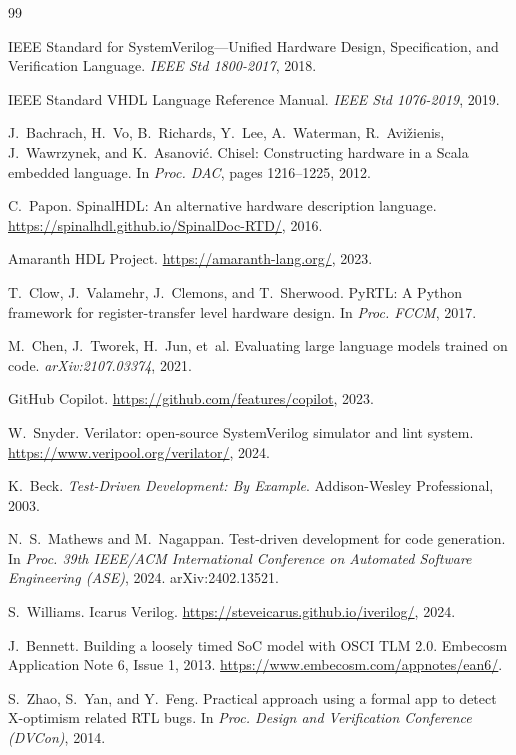 \documentclass[11pt,twocolumn]{article}
\begin{document}
\begin{thebibliography}{99}

IEEE Standard for SystemVerilog---Unified Hardware Design, Specification, and Verification Language.
\textit{IEEE Std 1800-2017}, 2018.

IEEE Standard VHDL Language Reference Manual.
\textit{IEEE Std 1076-2019}, 2019.

J.~Bachrach, H.~Vo, B.~Richards, Y.~Lee, A.~Waterman, R.~Avi\v{z}ienis, J.~Wawrzynek, and K.~Asanovi\'{c}.
Chisel: Constructing hardware in a Scala embedded language.
In \textit{Proc. DAC}, pages 1216--1225, 2012.

C.~Papon.
SpinalHDL: An alternative hardware description language.
\url{https://spinalhdl.github.io/SpinalDoc-RTD/}, 2016.

Amaranth HDL Project.
\url{https://amaranth-lang.org/}, 2023.

T.~Clow, J.~Valamehr, J.~Clemons, and T.~Sherwood.
PyRTL: A Python framework for register-transfer level hardware design.
In \textit{Proc. FCCM}, 2017.

M.~Chen, J.~Tworek, H.~Jun, et~al.
Evaluating large language models trained on code.
\textit{arXiv:2107.03374}, 2021.

GitHub Copilot.
\url{https://github.com/features/copilot}, 2023.

W.~Snyder.
Verilator: open-source SystemVerilog simulator and lint system.
\url{https://www.veripool.org/verilator/}, 2024.

K.~Beck.
\textit{Test-Driven Development: By Example}.
Addison-Wesley Professional, 2003.

N.~S.~Mathews and M.~Nagappan.
Test-driven development for code generation.
In \textit{Proc. 39th IEEE/ACM International Conference on Automated Software Engineering (ASE)}, 2024.
arXiv:2402.13521.

S.~Williams.
Icarus Verilog.
\url{https://steveicarus.github.io/iverilog/}, 2024.

J.~Bennett.
Building a loosely timed SoC model with OSCI TLM 2.0.
Embecosm Application Note 6, Issue 1, 2013.
\url{https://www.embecosm.com/appnotes/ean6/}.

S.~Zhao, S.~Yan, and Y.~Feng.
Practical approach using a formal app to detect X-optimism related RTL bugs.
In \textit{Proc. Design and Verification Conference (DVCon)}, 2014.


\end{thebibliography}
\end{document}
